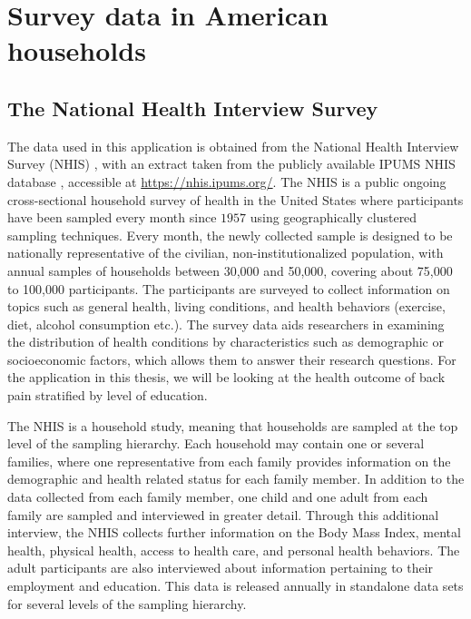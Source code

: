 \section{Survey data in American households}\label{section:surveyData}
\subsection{The National Health Interview Survey}
The data used in this application is obtained from the National Health Interview Survey (NHIS) \citep{NHIS-original}, with an extract taken from the publicly available IPUMS NHIS database \citep{IPUMS}, accessible at \href{https://nhis.ipums.org/}{https://nhis.ipums.org/}. The NHIS is a public ongoing cross-sectional household survey of health in the United States where participants have been sampled every month since $1957$ using geographically clustered sampling techniques. Every month, the newly collected sample is designed to be nationally representative of the civilian, non-institutionalized population, with annual samples of households between 30,000 and 50,000, covering about 75,000 to 100,000 participants. The participants are surveyed to collect information on topics such as general health, living conditions, and health behaviors (exercise, diet, alcohol consumption etc.). The survey data aids researchers in examining the distribution of health conditions by characteristics such as demographic or socioeconomic factors, which allows them to answer their research questions. For the application in this thesis, we will be looking at the health outcome of back pain stratified by level of education.

The NHIS is a household study, meaning that households are sampled at the top level of the sampling hierarchy. Each household may contain one or several families, where one representative from each family provides information on the demographic and health related status for each family member. In addition to the data collected from each family member, one child and one adult from each family are sampled and interviewed in greater detail. Through this additional interview, the NHIS collects further information on the Body Mass Index, mental health, physical health, access to health care, and personal health behaviors. The adult participants are also interviewed about information pertaining to their employment and education. This data is released annually in standalone data sets for several levels of the sampling hierarchy.

